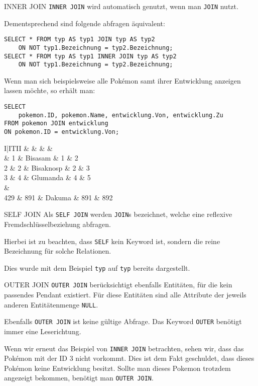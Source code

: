 \begin{sql}{INNER JOIN}
    \texttt{INNER JOIN} wird automatisch genutzt, wenn man \texttt{JOIN} nutzt.

    Dementsprechend sind folgende abfragen äquivalent:

    \begin{verbatim}
SELECT * FROM typ AS typ1 JOIN typ AS typ2
    ON NOT typ1.Bezeichnung = typ2.Bezeichnung;
SELECT * FROM typ AS typ1 INNER JOIN typ AS typ2
    ON NOT typ1.Bezeichnung = typ2.Bezeichnung;
    \end{verbatim}

    Wenn man sich beispielsweise alle Pokémon samt ihrer Entwicklung anzeigen lassen möchte, so erhält man:

    \begin{verbatim}
SELECT
    pokemon.ID, pokemon.Name, entwicklung.Von, entwicklung.Zu
FROM pokemon JOIN entwicklung
ON pokemon.ID = entwicklung.Von;
    \end{verbatim}

    \begin{tabular}{I|ITII}
        &  &  &  &  \\ & 1 & Bisasam & 1 & 2 \\
        2 & 2 & Bisaknosp & 2 & 3 \\
        3 & 4 & Glumanda & 4 & 5 \\
         &  \\
        429 & 891 & Dakuma & 891 & 892 \\
    \end{tabular}
\end{sql}

\begin{defi}{SELF JOIN}
    Als \texttt{SELF JOIN} werden \texttt{JOIN}s bezeichnet, welche eine reflexive Fremdschlüsselbeziehung abfragen.
    
    Hierbei ist zu beachten, dass \texttt{SELF} kein Keyword ist, sondern die reine Bezeichnung für solche Relationen.

    Dies wurde mit dem Beispiel \texttt{typ} auf \texttt{typ} bereits dargestellt.
\end{defi}

\begin{defi}{OUTER JOIN}
    \texttt{OUTER JOIN} berücksichtigt ebenfalls Entitäten, für die kein passendes Pendant existiert.
    Für diese Entitäten sind alle Attribute der jeweils anderen Entitätenmenge \texttt{NULL}.

    Ebenfalls \texttt{OUTER JOIN} ist keine gültige Abfrage.
    Das Keyword \texttt{OUTER} benötigt immer eine Leserichtung.

    Wenn wir erneut das Beispiel von \texttt{INNER JOIN} betrachten, sehen wir, dass das Pokémon mit der ID 3 nicht vorkommt.
    Dies ist dem Fakt geschuldet, dass dieses Pokémon keine Entwicklung besitzt.
    Sollte man dieses Pokemon trotzdem angezeigt bekommen, benötigt man \texttt{OUTER JOIN}.
\end{defi}


